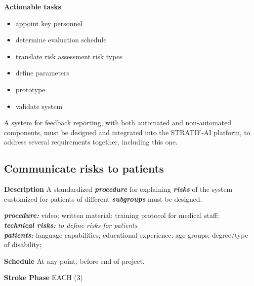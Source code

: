 \documentclass[
  letterpaper,
  DIV=11,
  numbers=noendperiod]{scrreport}
\providecommand{\tightlist}{%
  \setlength{\itemsep}{0pt}\setlength{\parskip}{0pt}}\usepackage{longtable,booktabs,array}
\begin{document}
\textbf{Actionable tasks}

\begin{itemize}
\tightlist
\item
  appoint key personnel
\item
  determine evaluation schedule
\item
  translate risk assessment risk types
\item
  define parameters
\item
  prototype
\item
  validate system
\end{itemize}

\begin{tcolorbox}[enhanced jigsaw, arc=.35mm, breakable, coltitle=black, toptitle=1mm, colbacktitle=quarto-callout-note-color!10!white, toprule=.15mm, left=2mm, bottomrule=.15mm, opacitybacktitle=0.6, titlerule=0mm, colback=white, opacityback=0, title=\textcolor{quarto-callout-note-color}{\faInfo}\hspace{0.5em}{Note}, bottomtitle=1mm, colframe=quarto-callout-note-color-frame, leftrule=.75mm, rightrule=.15mm]

A system for feedback reporting, with both automated and non-automated
components, must be designed and integrated into the STRATIF-AI
platform, to address several requirements together, including this one.

\end{tcolorbox}

\hypertarget{communicate-risks-to-patients}{%
\subsection{Communicate risks to
patients}\label{communicate-risks-to-patients}}

\textbf{Description} A standardized \textbf{\emph{procedure}} for
explaining \textbf{\emph{risks}} of the system customized for patients
of different \textbf{\emph{subgroups}} must be designed.

\textbf{\emph{procedure:}} video; written material; training protocol
for medical staff;\\
\textbf{\emph{technical risks:}} \emph{to define risks for patients}\\
\textbf{\emph{patients:}} language capabilities; educational experience;
age groups; degree/type of disability;

\textbf{Schedule} At any point, before end of project.

\textbf{Stroke Phase} EACH (3)
\end{document}

